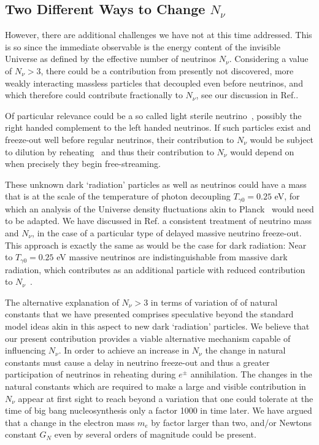 \subsection{Two Different Ways to Change $N_\nu$}

However, there are additional challenges we have not at this time addressed. This is so since the immediate observable is the energy content of the invisible Universe as defined by the effective number of neutrinos $N_\nu$. Considering a value of   $N_\nu>3$,  there could  be a contribution from presently not discovered, more weakly interacting massless particles that decoupled even before neutrinos, and which therefore could contribute fractionally to $N_\nu$, see our discussion in Ref.\cite{Birrell:2014connect}. 

Of particular relevance could be a so called light sterile neutrino~\cite{Abazajian:2012ys}, possibly the right handed complement to the left handed neutrinos. If such particles exist and freeze-out well before regular neutrinos, their contribution to $N_\nu$ would be subject to dilution by reheating~\cite{Birrell:2014connect} and thus their contribution to $N_\nu$ would depend on when precisely they begin free-streaming.

These unknown dark `radiation' particles as well as neutrinos could have a mass that is at the scale of the temperature of photon decoupling $T_{\gamma 0}=0.25$ eV, for which an analysis of the Universe density fluctuations akin to Planck~\cite{Planck} would need to be adapted. We have  discussed in Ref.\cite{Birrell:2013_2} a consistent treatment of neutrino mass and $N_\nu$,  in the case of a particular type of delayed massive neutrino  freeze-out. This approach is exactly the same as would be the case for dark radiation:  Near to $T_{\gamma 0}=0.25$ eV massive neutrinos are indistinguishable from massive dark radiation, which contributes as an additional particle with reduced contribution to $N_\nu$~\cite{Birrell:2014connect}.

The alternative explanation of $N_\nu>3$ in terms of variation of  of natural constants that we have presented comprises  speculative beyond the standard model ideas akin in this aspect to new dark `radiation' particles. We believe that our present contribution provides a viable alternative  mechanism  capable of influencing $N_\nu$. In order to achieve an increase in $N_\nu$ the change in natural constants must cause a delay in neutrino freeze-out and thus  a greater participation of neutrinos in reheating during $e^\pm$ annihilation. The changes in the natural constants  which are required to make a large and visible contribution in $N_\nu$ appear at first sight to reach beyond a variation that one could tolerate at the time of big bang nucleosynthesis only a factor 1000 in time later. We have argued that a change in the electron mass $m_e$ by factor larger than two, and/or Newtons constant $G_N$ even by several orders of magnitude  could be present.




